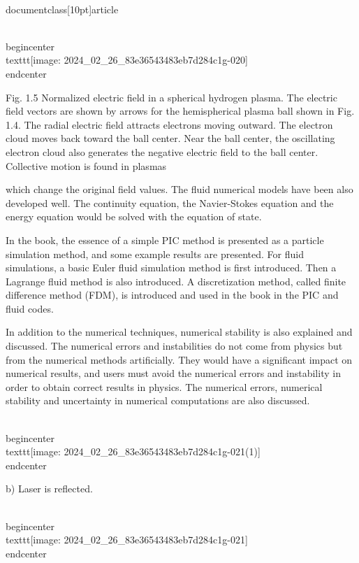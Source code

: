 \\documentclass[10pt]{article}
\begin{document}
\\begin{center}
\\texttt{[image: 2024\_02\_26\_83e36543483eb7d284c1g-020]}
\\end{center}

Fig. 1.5 Normalized electric field in a spherical hydrogen plasma. The electric field vectors are shown by arrows for the hemispherical plasma ball shown in Fig. 1.4. The radial electric field attracts electrons moving outward. The electron cloud moves back toward the ball center. Near the ball center, the oscillating electron cloud also generates the negative electric field to the ball center. Collective motion is found in plasmas

which change the original field values. The fluid numerical models have been also developed well. The continuity equation, the Navier-Stokes equation and the energy equation would be solved with the equation of state.

In the book, the essence of a simple PIC method is presented as a particle simulation method, and some example results are presented. For fluid simulations, a basic Euler fluid simulation method is first introduced. Then a Lagrange fluid method is also introduced. A discretization method, called finite difference method (FDM), is introduced and used in the book in the PIC and fluid codes.

In addition to the numerical techniques, numerical stability is also explained and discussed. The numerical errors and instabilities do not come from physics but from the numerical methods artificially. They would have a significant impact on numerical results, and users must avoid the numerical errors and instability in order to obtain correct results in physics. The numerical errors, numerical stability and uncertainty in numerical computations are also discussed.

\\begin{center}
\\texttt{[image: 2024\_02\_26\_83e36543483eb7d284c1g-021(1)]}
\\end{center}

b) Laser is reflected.

\\begin{center}
\\texttt{[image: 2024\_02\_26\_83e36543483eb7d284c1g-021]}
\\end{center}
\end{document}
